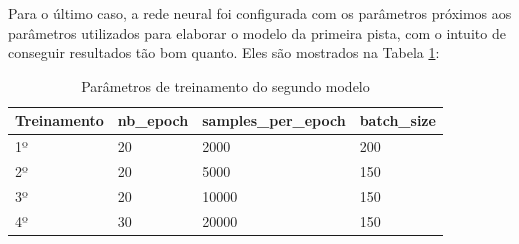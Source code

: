 	\begin{figure}[H]
		\centering
\end{figure}

Para o último caso, a rede neural foi configurada com os parâmetros próximos aos parâmetros utilizados para elaborar o modelo da primeira pista, com o intuito de conseguir resultados tão bom quanto. Eles são mostrados na Tabela \ref{tabela2}:

\begin{table}[H]
\centering
\caption{Parâmetros de treinamento do segundo modelo}
\label{tabela2}
\begin{tabular}{|l|l|l|l|}
\hline
\textbf{Treinamento} & \textbf{nb\_epoch} & \textbf{samples\_per\_epoch} & \textbf{batch\_size} \\ \hline
1º        & 20        & 2000                & 200         \\
2º        & 20        & 5000                & 150         \\
3º        & 20        & 10000               & 150         \\
4º        & 30        & 20000               & 150         \\ \hline
\end{tabular}
\end{table}

